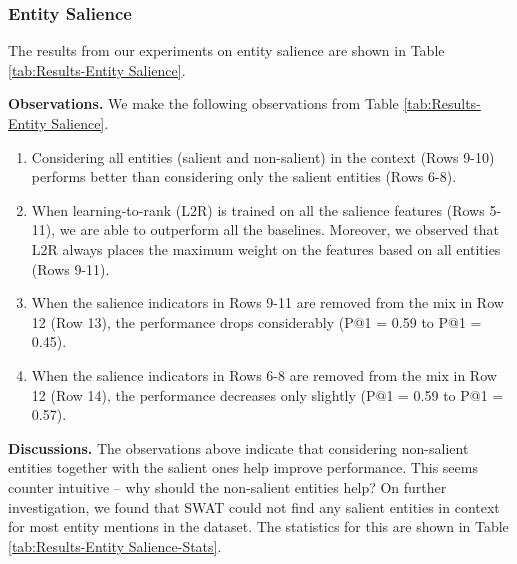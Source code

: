 \documentclass[sigconf,authordraft]{acmart}
\begin{document}
\subsubsection{Entity Salience}
\label{subsubsec:Entity Salience}

The results from our experiments on entity salience are shown in Table \ref{tab:Results-Entity Salience}. 

\textbf{Observations.} We make the following observations from Table \ref{tab:Results-Entity Salience}.

\begin{enumerate}

    \item Considering all entities (salient and non-salient) in the context (Rows 9-10) performs better than considering only the salient entities (Rows 6-8).
    
    \item When learning-to-rank (L2R) is trained on all the salience features (Rows 5-11), we are able to outperform all the baselines. Moreover, we observed that L2R always places the maximum weight on the features based on all entities (Rows 9-11).
    
    \item When the salience indicators in Rows 9-11 are removed from the mix in Row 12 (Row 13), the performance drops considerably (P@1 = 0.59 to P@1 = 0.45). 
    
    \item When the salience indicators in Rows 6-8 are removed from the mix in Row 12 (Row 14), the performance decreases only slightly (P@1 = 0.59 to P@1 = 0.57).
\end{enumerate}


\textbf{Discussions.} The observations above indicate that considering non-salient entities together with the salient ones help improve performance. This seems counter intuitive -- why should the non-salient entities help? On further investigation, we found that SWAT could not find any salient entities in context for most entity mentions in the dataset. The statistics for this are shown in Table \ref{tab:Results-Entity Salience-Stats}. 
\end{document}
